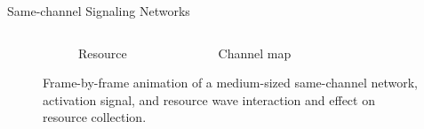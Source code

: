 \begin{frame}{Same-channel Signaling Networks}

\begin{figure}

\begin{columns}
\end{columns}

\begin{columns}
\begin{column}{0.45\textwidth}
  \begin{subfigure}[b]{\textwidth}
  \caption{Resource}
  \end{subfigure}
\end{column}

\begin{column}{0.45\textwidth}
  \begin{subfigure}[b]{\textwidth}
  \caption{Channel map}
  \end{subfigure}
\end{column}

\begin{column}{0.1\textwidth}
  \begin{subfigure}[b]{\textwidth}
  \end{subfigure}
\end{column}

\end{columns}

\caption{
Frame-by-frame animation of a medium-sized same-channel network, activation signal, and resource wave interaction and effect on resource collection.
}

\end{figure}

\end{frame}

